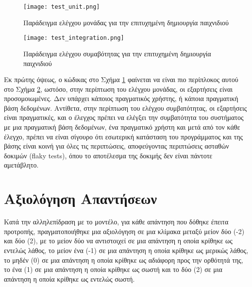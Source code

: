   \begin{figure}[H]
    \begin{center}
      \texttt{[image: test\_unit.png]}
      \caption{Παράδειγμα ελέγχου μονάδας για την επιτυχημένη δημιουργία
      παιχνιδιού}
    \end{center}
    \label{fig:TestUnit}
  \end{figure}

  \begin{figure}[H]
    \begin{center}
      \texttt{[image: test\_integration.png]}
      \caption{Παράδειγμα ελέγχου συμαβότητας για την επιτυχημένη
      δημιουργία παιχνιδιού}
    \end{center}
    \label{fig:TestIntegration}
  \end{figure}

  Εκ πρώτης όψεως, ο κώδικας στο Σχήμα \ref{fig:TestUnit} φαίνεται να
  είναι πιο περίπλοκος αυτού στο Σχήμα \ref{fig:TestIntegration}, ωστόσο,
  στην περίπτωση του ελέγχου μονάδας, οι εξαρτήσεις είναι προσομοιωμένες.
  Δεν υπάρχει κάποιος πραγματικός χρήστης, ή κάποια πραγματική βάση
  δεδομένων. Αντίθετα, στην περίπτωση του ελέγχου συμβατότητας, οι
  εξαρτήσεις είναι πραγματικές, και ο έλεγχος πρέπει να ελέγξει την
  συμβατότητα του συστήματος με μια πραγματική βάση δεδομένων, ένα
  πραγματικό χρήστη και μετά από τον κάθε έλεγχο, πρέπει να είναι σίγουρο
  ότι εσωτερική κατάσταση του προγράμματος και της βάσης είναι κοινή για
  όλες τις περιπτώσεις, αποφεύγοντας περιπτώσεις ασταθών δοκιμών
  (\textlatin{flaky tests}), όπου το αποτέλεσμα της δοκιμής δεν είναι
  πάντοτε αμετάβλητο. \cite{Parry2022}

  \section{Αξιολόγηση Απαντήσεων}

  Κατά την αλληλεπίδραση με το μοντέλο, για κάθε απάντηση που δόθηκε
  έπειτα προτροπής, πραγματοποιήθηκε μια αξιολόγηση σε μια κλίμακα μεταξύ
  μείον δύο (-2) και δύο (2), με το μείον δύο να αντιστοιχεί σε μια
  απάντηση η οποία κρίθηκε ως εντελώς λάθος, το μείον ένα (-1) σε μια
  απάντηση η οποία κρίθηκε ως μερικώς λάθος, το μηδέν (0) σε μια απάντηση
  η οποία κρίθηκε ως αδιάφορη προς την ορθότητά της, το ένα (1) σε μια
  απάντηση η οποία κρίθηκε ως σωστή και το δύο (2) σε μια απάντηση η οποία
  κρίθηκε ως εντελώς σωστή.

